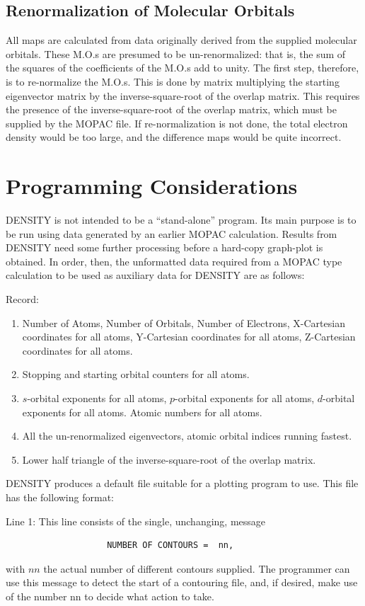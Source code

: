 \subsection{Renormalization of Molecular Orbitals}
  All maps are calculated from data originally derived from the supplied
molecular orbitals. These M.O.s are presumed to be un-renormalized: that
is, the sum of the squares of the coefficients of the M.O.s add to unity.
The first step, therefore, is to re-normalize the M.O.s. This is done
by matrix multiplying the starting eigenvector matrix by the
inverse-square-root of the overlap matrix. This requires the presence of
the inverse-square-root of the overlap matrix, which must be supplied by
the MOPAC file. If re-normalization is not done, the total
electron density would be too large, and the difference maps would be
quite incorrect.


\section{Programming Considerations}
 DENSITY is not intended to be a ``stand-alone'' program. Its main purpose
is to be run using data generated by an earlier MOPAC calculation.
Results from DENSITY need some further processing before a hard-copy
graph-plot is obtained.
 In order, then, the unformatted data required from
a MOPAC type calculation to be used as auxiliary
data for DENSITY are as follows:

Record:

\begin{enumerate}
\item Number of Atoms, Number of Orbitals, Number of Electrons,
X-Cartesian coordinates for all atoms, Y-Cartesian coordinates for all atoms,
Z-Cartesian coordinates for all atoms.
\item Stopping and starting orbital counters for all atoms.
\item $s$-orbital exponents for all atoms, $p$-orbital exponents for all atoms,
$d$-orbital exponents for all atoms. Atomic numbers for all atoms.
\item All the un-renormalized eigenvectors, atomic orbital indices running
fastest.
\item Lower half triangle of the inverse-square-root of the overlap matrix.
\end{enumerate}
 DENSITY produces a default file suitable for a plotting program to use.
This file has the following format:

 Line 1: This line consists of the single, unchanging, message
\begin{verbatim}
                    NUMBER OF CONTOURS =  nn,
\end{verbatim}
with  $nn$  the actual number of different contours supplied. The programmer
can use this message to detect the start of a contouring file, and, if
desired, make use of the number nn to decide what action to take.

